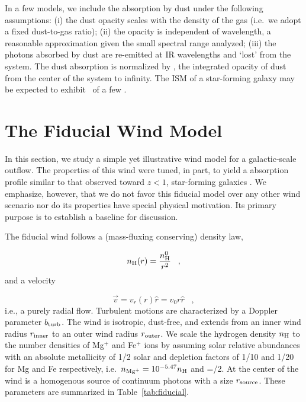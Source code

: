 \documentclass[12pt,preprint]{aastex}
\begin{document}
In a few models, we include the absorption by dust under the following
assumptions:
(i) the dust opacity scales with the density of the gas (i.e.\ we
adopt a fixed dust-to-gas ratio);
(ii) the opacity is independent of wavelength, a reasonable
approximation given the small spectral range analyzed;
(iii) the photons absorbed by dust are re-emitted at IR wavelengths
and `lost' from the system.  The dust absorption is normalized by \taud, 
the integrated opacity of dust from the center of the system to
infinity.  The ISM of a star-forming galaxy may be expected to exhibit
\taud\ of a few \citep[e.g.][]{steidel98}.



\section{The Fiducial Wind Model}
\label{sec:fiducial}

In this section, we study a simple yet illustrative wind model for
a galactic-scale outflow.  The properties of this wind were tuned, in
part, to yield a  absorption profile 
similar to that observed toward $z<1$, star-forming galaxies
\citep{wcp+09,rubin10b}.  We emphasize, however, that we do not
favor this fiducial model over any other wind scenario nor do its
properties have special physical motivation.
Its primary purpose is to establish a baseline
for discussion.

The fiducial wind follows a (mass-fluxing conserving) density law,

\begin{equation}
n_{\rm H} (r) = \frac{n^0_{\rm H}}{r^2} \;\;\; , 
\label{eqn:density}
\end{equation}
and a velocity 

\begin{equation}
\vec v = v_r (r) \hat r = v_0 r \hat r \;\;\; , 
\label{eqn:vel}
\end{equation}
i.e., a purely radial flow.  Turbulent motions are
characterized by a Doppler parameter $b_{\rm turb}$.  
The wind is isotropic, dust-free, and extends from an inner wind
radius $r_{\rm inner}$ to an outer wind radius $r_{\rm outer}$.  
We scale the hydrogen density $n_{\rm H}$ to the number densities of
Mg$^+$ and Fe$^+$ ions by assuming solar relative abundances with an
absolute metallicity of 1/2 solar and depletion factors of 1/10 and
1/20 for Mg and Fe respectively, i.e.\  $n_{\rm Mg^+} = 10^{-5.47} n_{\rm H}$ 
and \nfe=\nmg/2. At the center of the wind is a homogenous source of
continuum photons with a size $r_{\rm source}$. These parameters are
summarized in Table~\ref{tab:fiducial}.   
\end{document}
